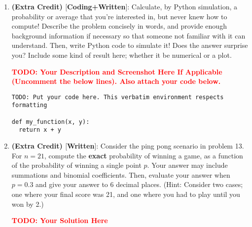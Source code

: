 \documentclass[12pt]{article}
\def\todo#1{\textcolor{red}{\textbf{#1}}}
\renewcommand{\|}{\mid}
\begin{document}
\begin{enumerate}
\item \textbf{(Extra Credit) $[$Coding+Written$]$}: Calculate, by Python simulation, a probability or average that you're interested in, but never knew how to compute! Describe the problem concisely in words, and provide enough background information if necessary so that someone not familiar with it can understand.  Then, write Python code to simulate it! Does the answer surprise you? Include some kind of result here; whether it be numerical or a plot. 
\begin{tcolorbox}
\todo{TODO: Your Description and Screenshot Here If Applicable (Uncomment the below lines). Also attach your code below.} 
\begin{verbatim}
TODO: Put your code here. This verbatim environment respects formatting

def my_function(x, y):
  return x + y
\end{verbatim}
\end{tcolorbox}

\item \textbf{(Extra Credit) $[$Written$]$}: Consider the ping pong scenario in problem 13. For $n=21$, compute the \textbf{exact} probability of winning a game, as a function of the probability of winning a single point $p$. Your answer may include summations and binomial coefficients. Then, evaluate your answer when $p=0.3$ and give your answer to 6 decimal places. (Hint: Consider two cases; one where your final score was 21, and one where you had to play until you won by 2.)

\begin{tcolorbox}
\todo{TODO: Your Solution Here}
\end{tcolorbox}



\end{enumerate}
\end{document}

